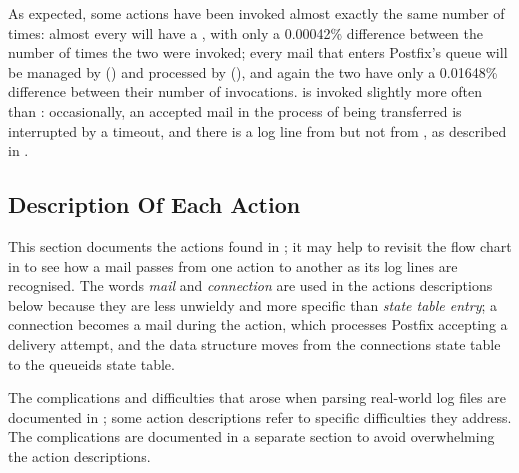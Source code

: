 As expected, some actions have been invoked almost exactly the same number
of times: almost every  will have a ,
with only a 0.00042\% difference between the number of times the two were
invoked; every mail that enters Postfix's queue will be managed by
 () and processed by 
(), and again the two have only a 0.01648\%
difference between their number of invocations.
 is invoked slightly more often than
: occasionally, an accepted mail in the process of
being transferred is interrupted by a timeout, and there is a log line from
 but not from , as described in
.



\subsection{Description Of Each Action}

\label{actions in detail in implementation}

This section documents the actions found in \parsername{}; it may help to
revisit the flow chart in  to see how a mail passes
from one action to another as its log lines are recognised.  The words
\textit{mail\/} and \textit{connection\/} are used in the actions
descriptions below because they are less unwieldy and more specific than
\textit{state table entry\/}; a connection becomes a mail during the
 action, which processes Postfix accepting a delivery
attempt, and the data structure moves from the connections state table to
the queueids state table.

The complications and difficulties that arose when parsing real-world log
files are documented in ; some action
descriptions refer to specific difficulties they address.  The
complications are documented in a separate section to avoid overwhelming
the action descriptions.

